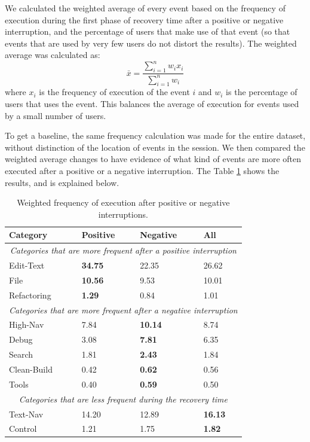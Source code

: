 We calculated the weighted average of every event based on the frequency of execution during the first phase of recovery time after a positive or negative interruption, and the percentage of users that make use of that event (so that events that are used by very few users do not distort the results). The weighted average was calculated as: $$\bar{x} = \frac{\sum_{i=1}^{n}w_ix_i}{\sum_{i=1}^{n}w_i} $$where $x_i$ is the frequency of execution of the event $i$ and $w_i$ is the percentage of users that uses the event. This balances the average of execution for events used by a small number of users. 

To get a baseline, the same frequency calculation was made for the entire dataset, without distinction of the location of events in the session. We then compared the weighted average changes to have evidence of what kind of events are more often executed after a positive or a negative interruption. The Table \ref{tbl:stats_events} shows the results, and is explained below.

\begin{table}[ht!]
	\small
	\caption{Weighted frequency of execution after positive or negative interruptions. }
	\label{tbl:stats_events}
	\centering
	\begin{tabular}{p{3cm}|p{2cm}|p{2cm}|p{2cm}} 
		\hline
		Category & Positive & Negative & All \\  
		\hline 
		\hline
		\multicolumn{4}{c}{\textit{Categories that are more frequent after a positive interruption}} \\
		\hline 
		Edit-Text &  \textbf{34.75} & 22.35 & 26.62 \\
		File &  \textbf{10.56} & 9.53 & 10.01\\
		Refactoring & \textbf{1.29} & 0.84 & 1.01 \\
		\hline 
		\multicolumn{4}{c}{\textit{Categories that are more frequent after a negative interruption}} \\
		\hline 
		High-Nav & 7.84 & \textbf{10.14} & 8.74  \\
		Debug & 3.08 & \textbf{7.81} & 6.35  \\
		Search & 1.81 & \textbf{2.43} & 1.84 \\
		Clean-Build & 0.42 & \textbf{0.62} & 0.56  \\
		Tools & 0.40 & \textbf{0.59} & 0.50 \\
		\hline 
		\multicolumn{4}{c}{\textit{Categories that are less frequent during the recovery time}} \\
		\hline 
		Text-Nav & 14.20 & 12.89 & \textbf{16.13} \\
		Control & 1.21 & 1.75 & \textbf{1.82} \\
		\hline
	\end{tabular}
\end{table}

